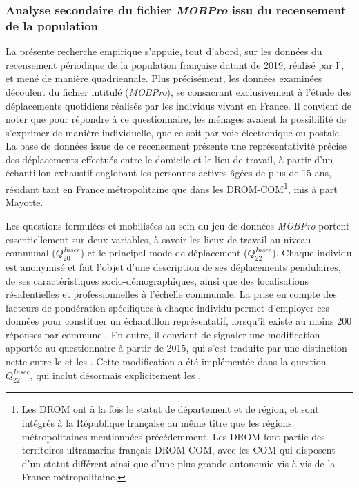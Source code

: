 \begin{refsegment}
\subsubsection*{Analyse secondaire du fichier \textsl{MOBPro} issu du recensement de la population
    \label{source-mobpro}
    }

La présente recherche empirique s'appuie, tout d'abord, sur les données du recensement périodique de la population française datant de 2019, réalisé par l'\textcolor{blue}{\textcite{insee_documentation_2023}}, et mené de manière quadriennale. Plus précisément, les données examinées découlent du fichier intitulé  (\textsl{MOBPro}), se consacrant exclusivement à l'étude des déplacements quotidiens réalisés par les individus vivant en France. Il convient de noter que pour répondre à ce questionnaire, les ménages avaient la possibilité de s'exprimer de manière individuelle, que ce soit par voie électronique ou postale. La base de données issue de ce recensement présente une représentativité précise des déplacements effectués entre le domicile et le lieu de travail, à partir d'un échantillon exhaustif englobant les personnes actives âgées de plus de 15 ans, résidant tant en France métropolitaine que dans les \acrfull{DROM-COM}\footnote{
    Les \acrfull{DROM} ont à la fois le statut de département et de région, et sont intégrés à la République française au même titre que les régions métropolitaines mentionnées précédemment. Les \acrshort{DROM} font partie des territoires ultramarins français \acrshort{DROM-COM}, avec les \acrfull{COM} qui disposent d'un statut différent ainsi que d'une plus grande autonomie vis-à-vis de la France métropolitaine.
}, mis à part Mayotte.%

Les questions formulées et mobilisées au sein du jeu de données \textsl{MOBPro} portent essentiellement sur deux variables, à savoir les lieux de travail au niveau communal (\(Q^{Insee}_{20}\)) et le principal mode de déplacement (\(Q^{Insee}_{22}\)). Chaque individu est anonymisé et fait l'objet d'une description de ses déplacements pendulaires, de ses caractéristiques socio-démographiques, ainsi que des localisations résidentielles et professionnelles à l'échelle communale. La prise en compte des facteurs de pondération spécifiques à chaque individu permet d'employer ces données pour constituer un échantillon représentatif, lorsqu'il existe au moins 200 réponses par commune \textcolor{blue}{\autocite{insee_documentation_2023}}. En outre, il convient de signaler une modification apportée au questionnaire à partir de 2015, qui s'est traduite par une distinction nette entre le  et les  \textcolor{blue}{\autocite{razemon_pour_2013}}. Cette modification a été implémentée dans la question~\(Q^{Insee}_{22}\), qui inclut désormais explicitement les .%


\end{refsegment}

